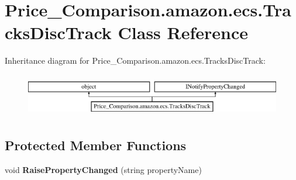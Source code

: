 \hypertarget{class_price___comparison_1_1amazon_1_1ecs_1_1_tracks_disc_track}{\section{Price\-\_\-\-Comparison.\-amazon.\-ecs.\-Tracks\-Disc\-Track Class Reference}
\label{class_price___comparison_1_1amazon_1_1ecs_1_1_tracks_disc_track}
}


 


Inheritance diagram for Price\-\_\-\-Comparison.\-amazon.\-ecs.\-Tracks\-Disc\-Track\-:\begin{figure}[H]
\begin{center}
\leavevmode
\includegraphics[height=1.904762cm]{class_price___comparison_1_1amazon_1_1ecs_1_1_tracks_disc_track}
\end{center}
\end{figure}
\subsection*{Protected Member Functions}
\begin{DoxyCompactItemize}
\item 
\hypertarget{class_price___comparison_1_1amazon_1_1ecs_1_1_tracks_disc_track_a94a32c22a866f19f4c92233eaf335f0a}{void {\bfseries Raise\-Property\-Changed} (string property\-Name)}\label{class_price___comparison_1_1amazon_1_1ecs_1_1_tracks_disc_track_a94a32c22a866f19f4c92233eaf335f0a}

\end{DoxyCompactItemize}
